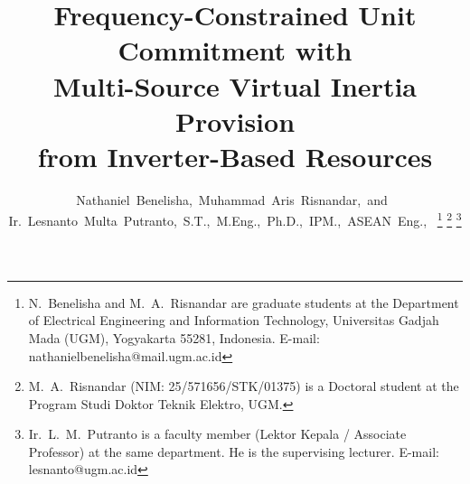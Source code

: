 \documentclass[journal]{IEEEtran}
\begin{document}
\title{Frequency-Constrained Unit Commitment with\\
Multi-Source Virtual Inertia Provision\\
from Inverter-Based Resources}

\author{Nathaniel~Benelisha,~Muhammad~Aris~Risnandar,~and~%
Ir.~Lesnanto~Multa~Putranto,~S.T.,~M.Eng.,~Ph.D.,~IPM.,~ASEAN~Eng.,~%
\thanks{N.~Benelisha and M.~A.~Risnandar are graduate students at the
Department of Electrical Engineering and Information Technology,
Universitas Gadjah Mada (UGM), Yogyakarta 55281, Indonesia.
E-mail: nathanielbenelisha@mail.ugm.ac.id}%
\thanks{M.~A.~Risnandar (NIM: 25/571656/STK/01375) is a Doctoral student
at the Program Studi Doktor Teknik Elektro, UGM.}%
\thanks{Ir.~L.~M.~Putranto is a faculty member (Lektor Kepala / Associate Professor)
at the same department. He is the supervising lecturer.
E-mail: lesnanto@ugm.ac.id}}

\maketitle
\end{document}
